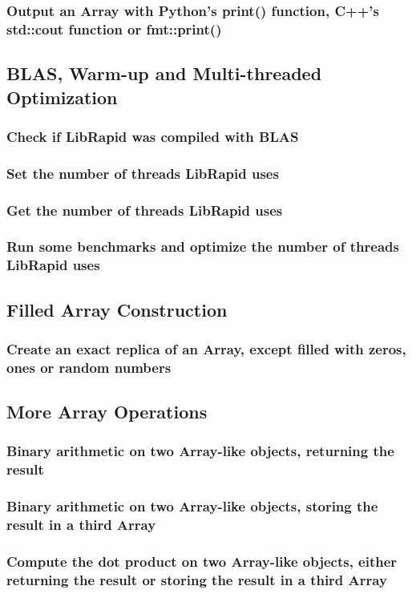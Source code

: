 \documentclass[10pt,a4paper]{report}
\begin{document}
			\subsubsection{Output an Array with Python's print() function, C++'s std::cout function or fmt::print()}
		\subsection{BLAS, Warm-up and Multi-threaded Optimization}
			\subsubsection{Check if LibRapid was compiled with BLAS}
			\subsubsection{Set the number of threads LibRapid uses}
			\subsubsection{Get the number of threads LibRapid uses}
			\subsubsection{Run some benchmarks and optimize the number of threads LibRapid uses}
		\subsection{Filled Array Construction}
			\subsubsection{Create an exact replica of an Array, except filled with zeros, ones or random numbers}
		\subsection{More Array Operations}
			\subsubsection{Binary arithmetic on two Array-like objects, returning the result}
			\subsubsection{Binary arithmetic on two Array-like objects, storing the result in a third Array}
			\subsubsection{Compute the dot product on two Array-like objects, either returning the result or storing the result in a third Array}
\end{document}

